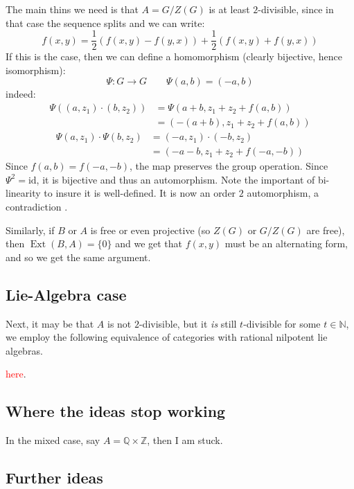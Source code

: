 \documentclass{book}
\newcommand{\N}{{\mathbb{N}}}
\newcommand{\Q}{{\mathbb{Q}}}
\newcommand{\Z}{{\mathbb{Z}}}
\newcommand{\Ext}{{\operatorname{Ext}}}
\begin{document}
The main thins we need is that $A = G/Z(G)$ is at least $2$-divisible, since in that case the sequence splits
and we can write:
\[
  f(x,y) = \frac{1}{2} \left(f(x,y) - f(y,x)\right) + \frac{1}{2} \left(f(x,y) + f(y,x)\right)
\]
If this is the case, then we can define a homomorphism (clearly bijective, hence isomorphism):
\[
  \Psi: G \to G \qquad \Psi(a,b) = (-a,b)
\]
indeed:
\begin{align*}
\Psi((a, z_1) \cdot (b, z_2)) &= \Psi(a+b, z_1+z_2+f(a, b)) \\
&= (-(a+b), z_1+z_2+f(a, b))
\end{align*}
\begin{align*}
\Psi(a, z_1) \cdot \Psi(b, z_2) &= (-a, z_1) \cdot (-b, z_2) \\
&= (-a-b, z_1+z_2+f(-a, -b))
\end{align*}
Since $f(a, b) = f(-a, -b)$, the map preserves the group operation. Since $\Psi^2 = \text{id}$, it is bijective and thus an automorphism.
Note the important of bi-linearity to insure it is well-defined. It is now an order $2$ automorphism,
a contradiction .

Similarly, if $B$ or $A$ is free or even projective (so $Z(G)$ or $G/Z(G)$ are free), then $\Ext(B,A) = \{0\}$
and we get that $f(x,y)$ must be an alternating form, and so we get the same argument.

\subsection{Lie-Algebra case}

Next, it may be that $A$ is not $2$-divisible, but it \emph{is} still $t$-divisible for some $t \in \N$, we employ
the following equivalence of categories with rational nilpotent lie algebras.

\textcolor{red}{here}.

\subsection{Where the ideas stop working}

In the mixed case, say $A = \Q\times \Z$, then I am stuck.



\subsection{Further ideas}
\end{document}

